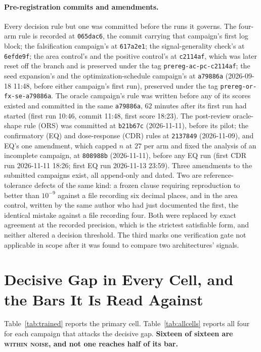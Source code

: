 \documentclass{article}
\newif\ifrevmarked \revmarkedtrue
\DeclareRobustCommand{\revB}[1]{\ifrevmarked{\color{RevB}#1}\else{#1}\fi}
\DeclareRobustCommand{\revShared}[1]{\ifrevmarked{\color{RevShared}#1}\else{#1}\fi}
\begin{document}
\paragraph{Pre-registration commits and amendments.} Every decision rule \revB{but one} was committed before the
runs it governs. The four-arm rule is recorded at \texttt{065dac6}, the commit carrying that
campaign's first log block; the falsification campaign's at \texttt{617a2e1}; the signal-generality
check's at \texttt{6efde9f}; the area control's and the positive control's at \texttt{c2114af}\revB{, which was later reset off
the branch and is preserved under the tag \texttt{prereg-ac-pc-c2114af}; the seed expansion's and the
optimization-schedule campaign's at \texttt{a79886a} (2026-09-18 11:48, before either campaign's first run), preserved
under the tag \texttt{prereg-or-fx-se-a79886a}. The oracle campaign's rule was written before any of its scores existed
and committed in the same \texttt{a79886a}, $62$ minutes after its first run had started (first run 10:46, commit
11:48, first score 18:23). The post-review oracle-shape rule (ORS) was committed at \texttt{b21b67c} (2026-11-11), before its
pilot}\revShared{; the confirmatory (EQ) and dose-response (CDR) rules at \texttt{2137849} (2026-11-09), and EQ's one
amendment, which capped $n$ at $27$ per arm and fixed the analysis of an incomplete campaign, at \texttt{808988b}
(2026-11-11), before any EQ run (first CDR run 2026-11-11 18:26; first EQ run 2026-11-13 23:59)}. Three amendments \revShared{to the submitted campaigns} exist, all append-only and dated. Two are reference-tolerance defects of the
same kind: a frozen clause requiring reproduction to better than $10^{-9}$ against a file recording
six decimal places, and in the area control, written by the same author who had just documented
the first, the identical mistake against a file recording four. Both were replaced by exact
agreement at the recorded precision, which is the strictest satisfiable form, and neither altered a
decision threshold. The third marks one verification gate not applicable in scope after it was found
to compare two architectures' signals.


\section{Decisive Gap in Every Cell, and the Bars It Is Read Against}
\label{app:diag}

Table~\ref{tab:trained} reports the primary cell. Table~\ref{tab:allcells} reports all four for
each campaign that attacks the decisive gap. \textbf{Sixteen of sixteen are \textsc{within noise},
and not one reaches half of its bar.}
\end{document}
